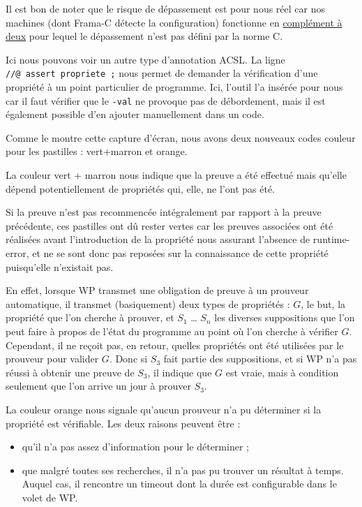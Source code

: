 \documentclass[12pt,francais,]{scrbook}
\providecommand{\tightlist}{%
  \setlength{\itemsep}{0pt}\setlength{\parskip}{0pt}}
\newenvironment{zdsblock}[1]{%
  \tcolorbox[beamer,%
    noparskip,breakable,
    colback=LightBlue,colframe=DarkBlue,%
    colbacklower=DarkBlue,%
    title=#1]
}{\endtcolorbox}
\begin{document}
\begin{zdsblock}{Information}
  Il est bon de noter que le risque de
  dépassement est pour nous réel car nos machines (dont Frama-C
  détecte la configuration) fonctionne en
  \href{https://fr.wikipedia.org/wiki/Compl\%C3\%A9ment_\%C3\%A0_deux}{complément
à deux} pour lequel le dépassement n'est pas défini par la norme C.
\end{zdsblock}
  
Ici nous pouvons voir un autre type d'annotation ACSL. La ligne
\texttt{//@\ assert\ propriete\ ;} nous permet de demander la
vérification d'une propriété à un point particulier de programme. Ici,
l'outil l'a insérée pour nous car il faut vérifier que le \texttt{-val}
ne provoque pas de débordement, mais il est également possible d'en
ajouter manuellement dans un code.

Comme le montre cette capture d'écran, nous avons deux nouveaux codes
couleur pour les pastilles : vert+marron et orange.

La couleur vert + marron nous indique que la preuve a été effectué mais
qu'elle dépend potentiellement de propriétés qui, elle, ne l'ont pas
été.

Si la preuve n'est pas recommencée intégralement par rapport à la preuve
précédente, ces pastilles ont dû rester vertes car les preuves associées
ont été réalisées avant l'introduction de la propriété nous assurant
l'absence de runtime-error, et ne se sont donc pas reposées sur la
connaissance de cette propriété puisqu'elle n'existait pas.

En effet, lorsque WP transmet une obligation de preuve à un prouveur
automatique, il transmet (basiquement) deux types de propriétés : \(G\),
le but, la propriété que l'on cherche à prouver, et \(S_1\) \ldots{}
\(S_n\) les diverses suppositions que l'on peut faire à propos de l'état
du programme au point où l'on cherche à vérifier \(G\). Cependant, il ne
reçoit pas, en retour, quelles propriétés ont été utilisées par le
prouveur pour valider \(G\). Donc si \(S_3\) fait partie des
suppositions, et si WP n'a pas réussi à obtenir une preuve de \(S_3\),
il indique que \(G\) est vraie, mais à condition seulement que l'on
arrive un jour à prouver \(S_3\).

La couleur orange nous signale qu'aucun prouveur n'a pu déterminer si la
propriété est vérifiable. Les deux raisons peuvent être :

\begin{itemize}
\tightlist
\item
  qu'il n'a pas assez d'information pour le déterminer ;
\item
  que malgré toutes ses recherches, il n'a pas pu trouver un résultat à
  temps. Auquel cas, il rencontre un timeout dont la durée est
  configurable dans le volet de WP.
\end{itemize}
\end{document}

